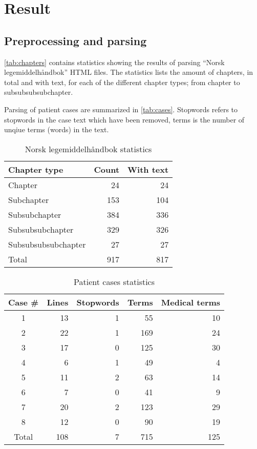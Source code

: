\chapter{Result}


\section{Preprocessing and parsing}
\autoref{tab:chapters} contains statistics showing the results of parsing
``Norsk legemiddelhåndbok'' HTML files. The statistics lists the amount
of chapters, in total and with text, for each of the different chapter
types; from chapter to subsubsubsubchapter.

Parsing of patient cases are summarized in \autoref{tab:cases}. Stopwords
refers to stopwords in the case text which have been removed, terms is the
number of unqiue terms (words) in the text.

\begin{table}[htbp] \footnotesize \center
\caption{Norsk legemiddelhåndbok statistics\label{tab:chapters}}
\begin{tabular}{l r r}
    \toprule
    Chapter type & Count & With text \\
    \midrule
	Chapter & 24 & 24 \\
	Subchapter & 153 & 104 \\
	Subsubchapter & 384 & 336 \\
	Subsubsubchapter & 329 & 326 \\
	Subsubsubsubchapter & 27 & 27 \\
    \midrule
	Total & 917 & 817 \\
	\bottomrule
\end{tabular}
\end{table}

\begin{table}[htbp] \footnotesize \center
\caption{Patient cases statistics\label{tab:cases}}
\begin{tabular}{c r r r r}
    \toprule
	Case \# & Lines & Stopwords & Terms & Medical terms \\
    \midrule
	1 & 13 & 1 & 55 & 10 \\
	2 & 22 & 1 & 169 & 24 \\
	3 & 17 & 0 & 125 & 30 \\
	4 & 6 & 1 & 49 & 4 \\
	5 & 11 & 2 & 63 & 14 \\
	6 & 7 & 0 & 41 & 9 \\
	7 & 20 & 2 & 123 & 29 \\
	8 & 12 & 0 & 90 & 19 \\
    \midrule
	Total & 108 & 7 & 715 & 125 \\
	\bottomrule
\end{tabular}
\end{table}


